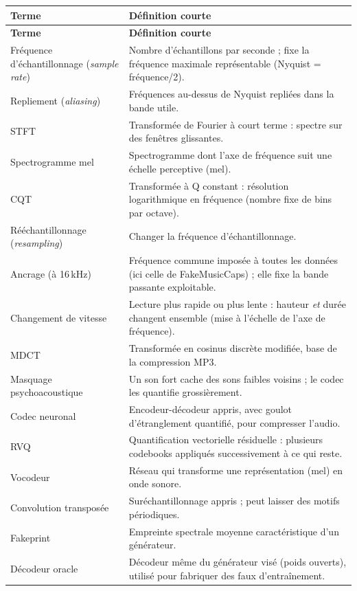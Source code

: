 \documentclass[11pt,a4paper]{article}
\begin{document}
{\small
\begin{longtable}{L{4.2cm}L{11.0cm}}
\toprule
\textbf{Terme} & \textbf{Définition courte}\\
\midrule
\endfirsthead
\toprule
\textbf{Terme} & \textbf{Définition courte}\\
\midrule
\endhead
\bottomrule
\endfoot
Fréquence d'échantillonnage (\emph{sample rate}) & Nombre d'échantillons par seconde ; fixe la fréquence maximale représentable (Nyquist = fréquence/2).\\
Repliement (\emph{aliasing}) & Fréquences au-dessus de Nyquist repliées dans la bande utile.\\
STFT & Transformée de Fourier à court terme : spectre sur des fenêtres glissantes.\\
Spectrogramme mel & Spectrogramme dont l'axe de fréquence suit une échelle perceptive (mel).\\
CQT & Transformée à Q constant : résolution logarithmique en fréquence (nombre fixe de bins par octave).\\
Rééchantillonnage (\emph{resampling}) & Changer la fréquence d'échantillonnage.\\
Ancrage (à 16\,kHz) & Fréquence commune imposée à toutes les données (ici celle de FakeMusicCaps) ; elle fixe la bande passante exploitable.\\
Changement de vitesse & Lecture plus rapide ou plus lente : hauteur \emph{et} durée changent ensemble (mise à l'échelle de l'axe de fréquence).\\
MDCT & Transformée en cosinus discrète modifiée, base de la compression MP3.\\
Masquage psychoacoustique & Un son fort cache des sons faibles voisins ; le codec les quantifie grossièrement.\\
Codec neuronal & Encodeur-décodeur appris, avec goulot d'étranglement quantifié, pour compresser l'audio.\\
RVQ & Quantification vectorielle résiduelle : plusieurs codebooks appliqués successivement à ce qui reste.\\
Vocodeur & Réseau qui transforme une représentation (mel) en onde sonore.\\
Convolution transposée & Suréchantillonnage appris ; peut laisser des motifs périodiques.\\
Fakeprint & Empreinte spectrale moyenne caractéristique d'un générateur.\\
Décodeur oracle & Décodeur même du générateur visé (poids ouverts), utilisé pour fabriquer des faux d'entraînement.\\

\end{longtable}}
\end{document}
